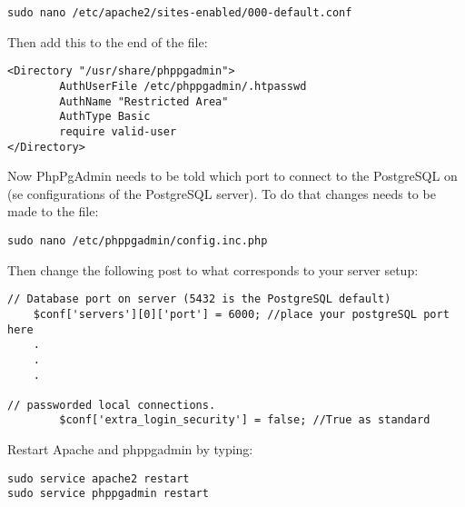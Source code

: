 \begin{verbatim}
sudo nano /etc/apache2/sites-enabled/000-default.conf
\end{verbatim}
Then add this to the end of the file:

\begin{verbatim}
<Directory "/usr/share/phppgadmin">
        AuthUserFile /etc/phppgadmin/.htpasswd
        AuthName "Restricted Area"
        AuthType Basic
        require valid-user
</Directory>

\end{verbatim}

Now PhpPgAdmin needs to be told which port to connect to the PostgreSQL on (se configurations of the PostgreSQL server). %
To do that changes needs to be made to the file:
\begin{verbatim}
sudo nano /etc/phppgadmin/config.inc.php
\end{verbatim}
Then change the following post to what corresponds to your server setup:
\begin{verbatim}
// Database port on server (5432 is the PostgreSQL default)
    $conf['servers'][0]['port'] = 6000; //place your postgreSQL port here 
    .
    .
    .

// passworded local connections.
    	$conf['extra_login_security'] = false; //True as standard

\end{verbatim}




Restart Apache and phppgadmin by typing:
\begin{verbatim}
sudo service apache2 restart
sudo service phppgadmin restart
\end{verbatim}